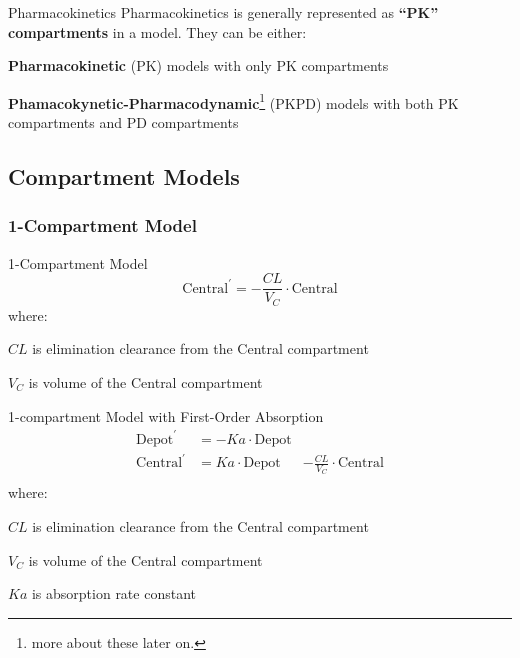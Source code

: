 \begin{frame}{Pharmacokinetics}
    Pharmacokinetics is generally represented as \textbf{``PK'' compartments} in a model.
    \vfill
    They can be either:
    \begin{vfilleditems}
        \item \textbf{Pharmacokinetic} (PK) models with only PK compartments
        \item \textbf{Phamacokynetic-Pharmacodynamic}\footnote{more about these later on.} (PKPD) models with both PK compartments and PD compartments
    \end{vfilleditems}
\end{frame}

\subsection{Compartment Models}
\subsubsection{1-Compartment Model}
\begin{frame}{1-Compartment Model}
    $$
        \text{Central}^{\prime} = -\frac{CL}{V_C} \cdot \text{Central}
    $$
    where:
    \begin{vfilleditems}
        \item $CL$ is elimination clearance from the Central compartment
        \item $V_C$ is volume of the Central compartment
    \end{vfilleditems}
\end{frame}

\begin{frame}{1-compartment Model with First-Order Absorption}
    $$
        \begin{aligned}
            \text{Depot}^{\prime}   & =        -Ka \cdot \text{Depot}                                        \\
            \text{Central}^{\prime} & =  Ka \cdot \text{Depot}        & -\frac{CL}{V_C} \cdot \text{Central} \\
        \end{aligned}
    $$
    where:
    \begin{vfilleditems}
        \item $CL$ is elimination clearance from the Central compartment
        \item $V_C$ is volume of the Central compartment
        \item $Ka$ is absorption rate constant
    \end{vfilleditems}

\end{frame}

